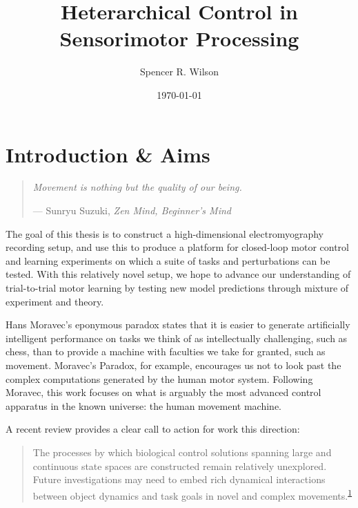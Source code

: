\documentclass[
  a4paper,
]{article}
\title{Heterarchical Control in Sensorimotor Processing}
\author{Spencer R. Wilson}
\date{\today}
\begin{document}
\maketitle

\hypertarget{sec:intro}{%
\section{Introduction \& Aims}\label{sec:intro}}

\begin{quote}
\emph{Movement is nothing but the quality of our being.}

--- Sunryu Suzuki, \emph{Zen Mind, Beginner's Mind}
\end{quote}

The goal of this thesis is to construct a high-dimensional
electromyography recording setup, and use this to produce a platform for
closed-loop motor control and learning experiments on which a suite of
tasks and perturbations can be tested. With this relatively novel setup,
we hope to advance our understanding of trial-to-trial motor learning by
testing new model predictions through mixture of experiment and theory.

Hans Moravec's eponymous paradox states that it is easier to generate
artificially intelligent performance on tasks we think of as
intellectually challenging, such as chess, than to provide a machine
with faculties we take for granted, such as movement. Moravec's Paradox,
for example, encourages us not to look past the complex computations
generated by the human motor system. Following Moravec, this work
focuses on what is arguably the most advanced control apparatus in the
known universe: the human movement machine.

A recent review provides a clear call to action for work this direction:

\begin{quote}
The processes by which biological control solutions spanning large and
continuous state spaces are constructed remain relatively unexplored.
Future investigations may need to embed rich dynamical interactions
between object dynamics and task goals in novel and complex
movements.\textsuperscript{\protect\hyperlink{ref-McNamee2019}{1}}
\end{quote}
\end{document}
